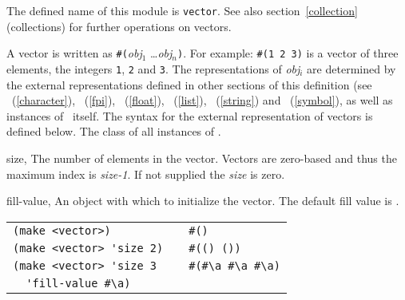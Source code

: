 \label{vector}
%
\begin{optDefinition}
The defined name of this module is {\tt vector}.  See also
section~\ref{collection} (collections) for further operations on
vectors.

%
A vector is written as
\verb+#(+{\em obj}$_1$ \ldots {\em obj}$_n$\verb+)+.  For example:
\verb+#(1 2 3)+ is a vector of three elements, the integers {\tt 1}, {\tt 2} and
{\tt 3}.  The representations of {\em obj$_i$} are determined by the external
representations defined in other sections of this definition (see
\ (\ref{character}), \
(\ref{fpi}), \ (\ref{float}), \ (\ref{list}),
\classref{string}\ (\ref{string}) and \classref{symbol}\ (\ref{symbol}), as well
as instances of \classref{vector}\ itself.  The syntax for the external
representation of vectors is defined below.
%
\Syntax
\label{vector-syntax}
%
%
%
The class of all instances of .
%
\begin{initoptions}
    \item[size, \classref{fixed-precision-integer}] The number of elements in
    the vector.  Vectors are zero-based and thus the maximum index is {\em
        size-1}.  If not supplied the {\em size\/} is zero.

    \item[fill-value, \classref{object}] An object with which to initialize the
    vector.  The default fill value is \nil{}.
\end{initoptions}
%
\examples
\begin{tabular}{lcl}
    \verb|(make <vector>)| &\Ra& \verb|#()|\\
    \verb|(make <vector> 'size 2)| &\Ra& \verb|#(() ())|\\
    \verb|(make <vector> 'size 3| &\Ra& \verb|#(#\a #\a #\a)|\\
    \verb|  'fill-value #\a)|&&\\
\end{tabular}


\end{optDefinition}
